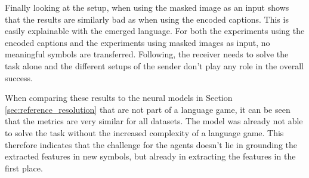 Finally looking at the setup, when using the masked image as an input shows that the results are similarly bad as when using the encoded captions.
This is easily explainable with the emerged language.
For both the experiments using the encoded captions and the experiments using masked images as input, no meaningful symbols are transferred.
Following, the receiver needs to solve the task alone and the different setups of the sender don't play any role in the overall success.

When comparing these results to the neural models in Section \ref{sec:reference_resolution} that are not part of a language game, it can be seen that the metrics are very similar for all datasets.
The model was already not able to solve the task without the increased complexity of a language game.
This therefore indicates that the challenge for the agents doesn't lie in grounding the extracted features in new symbols, but already in extracting the features in the first place.